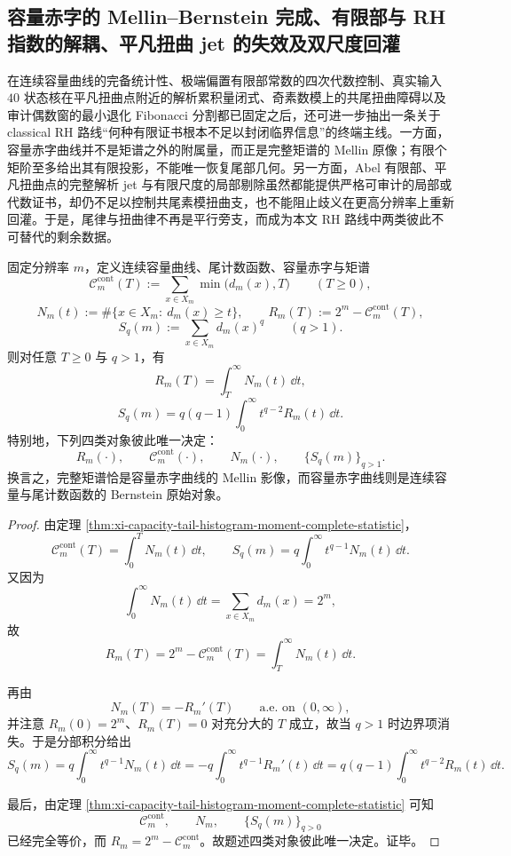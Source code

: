 \subsection{容量赤字的 Mellin--Bernstein 完成、有限部与 RH 指数的解耦、平凡扭曲 jet 的失效及双尺度回灌}\label{subsec:conclusion-tail-twist-dual-obstruction-capacity-finitepart-jet-feedback}

在连续容量曲线的完备统计性、极端偏置有限部常数的四次代数控制、真实输入 \(40\) 状态核在平凡扭曲点附近的解析累积量闭式、奇素数模上的共尾扭曲障碍以及审计偶数窗的最小退化 Fibonacci 分割都已固定之后，还可进一步抽出一条关于 classical RH 路线“何种有限证书根本不足以封闭临界信息”的终端主线。一方面，容量赤字曲线并不是矩谱之外的附属量，而正是完整矩谱的 Mellin 原像；有限个矩阶至多给出其有限投影，不能唯一恢复尾部几何。另一方面，Abel 有限部、平凡扭曲点的完整解析 jet 与有限尺度的局部剔除虽然都能提供严格可审计的局部或代数证书，却仍不足以控制共尾素模扭曲支，也不能阻止歧义在更高分辨率上重新回灌。于是，尾律与扭曲律不再是平行旁支，而成为本文 RH 路线中两类彼此不可替代的剩余数据。

\begin{theorem}\label{thm:conclusion-capacity-deficit-mellin-bernstein-completion}
固定分辨率 \(m\)，定义连续容量曲线、尾计数函数、容量赤字与矩谱
\[
\mathcal C_m^{\mathrm{cont}}(T):=\sum_{x\in X_m}\min\bigl(d_m(x),T\bigr)
\qquad(T\ge 0),
\]
\[
N_m(t):=\#\{x\in X_m:\ d_m(x)\ge t\},
\qquad
R_m(T):=2^m-\mathcal C_m^{\mathrm{cont}}(T),
\]
\[
S_q(m):=\sum_{x\in X_m}d_m(x)^q
\qquad(q>1).
\]
则对任意 \(T\ge 0\) 与 \(q>1\)，有
\[
R_m(T)=\int_T^\infty N_m(t)\,\dd t,
\]
\[
S_q(m)=q(q-1)\int_0^\infty t^{q-2}R_m(t)\,\dd t.
\]
特别地，下列四类对象彼此唯一决定：
\[
R_m(\cdot),\qquad
\mathcal C_m^{\mathrm{cont}}(\cdot),\qquad
N_m(\cdot),\qquad
\{S_q(m)\}_{q>1}.
\]
换言之，完整矩谱恰是容量赤字曲线的 Mellin 影像，而容量赤字曲线则是连续容量与尾计数函数的 Bernstein 原始对象。
\end{theorem}
\begin{proof}
由定理 \ref{thm:xi-capacity-tail-histogram-moment-complete-statistic}，
\[
\mathcal C_m^{\mathrm{cont}}(T)=\int_0^T N_m(t)\,\dd t,
\qquad
S_q(m)=q\int_0^\infty t^{q-1}N_m(t)\,\dd t.
\]
又因为
\[
\int_0^\infty N_m(t)\,\dd t=\sum_{x\in X_m}d_m(x)=2^m,
\]
故
\[
R_m(T)=2^m-\mathcal C_m^{\mathrm{cont}}(T)=\int_T^\infty N_m(t)\,\dd t.
\]

再由
\[
N_m(T)=-R_m'(T)
\qquad\text{a.e.\ on }(0,\infty),
\]
并注意 \(R_m(0)=2^m\)、\(R_m(T)=0\) 对充分大的 \(T\) 成立，故当 \(q>1\) 时边界项消失。于是分部积分给出
\[
S_q(m)
=
q\int_0^\infty t^{q-1}N_m(t)\,\dd t
=
-q\int_0^\infty t^{q-1}R_m'(t)\,\dd t
=
q(q-1)\int_0^\infty t^{q-2}R_m(t)\,\dd t.
\]

最后，由定理 \ref{thm:xi-capacity-tail-histogram-moment-complete-statistic} 可知
\[
\mathcal C_m^{\mathrm{cont}},\qquad N_m,\qquad \{S_q(m)\}_{q>0}
\]
已经完全等价，而 \(R_m=2^m-\mathcal C_m^{\mathrm{cont}}\)。故题述四类对象彼此唯一决定。证毕。
\end{proof}

